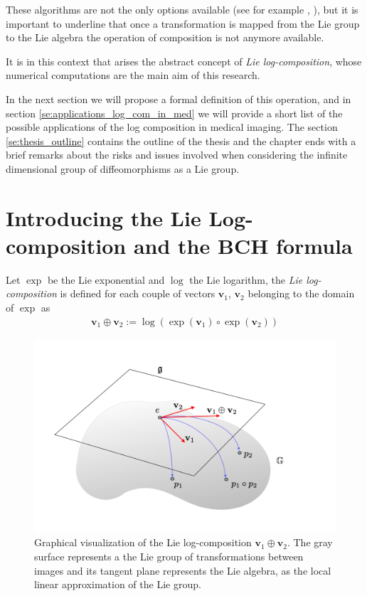 These algorithms are not the only options available (see for example \cite{bossa2008algorithms}, \cite{bossa2008new}), but it is important to underline that once a transformation is mapped from the Lie group to the Lie algebra the operation of composition is not anymore available. 

It is in this context that arises the abstract concept of \emph{Lie log-composition}, whose numerical computations are the main aim of this research.

In the next section we will propose a formal definition of this operation, and in section \ref{se:applications_log_com_in_med} we will provide a short list of the possible applications of the log composition in medical imaging. 
The section \ref{se:thesis_outline} contains the outline of the thesis and the chapter ends with 
a brief remarks about the risks and issues involved when considering the infinite dimensional group of diffeomorphisms as a Lie group. 

\section{Introducing the Lie Log-composition and the BCH formula}\label{se:introducing_log_composition}

% 
Let $\exp$ be the Lie exponential  and $\log$ the Lie logarithm, the \emph{Lie log-composition} is defined for each couple of vectors $\mathbf{v}_1$, $\mathbf{v}_2$ belonging to the domain of $\exp$ as
\begin{align}\label{eq:bch_problem}
\mathbf{v}_1 \oplus \mathbf{v}_2 := \log(\exp(\mathbf{v}_1)\circ\exp(\mathbf{v}_2))
\end{align}

\begin{figure}[!ht]
	\centering
	\includegraphics[scale=0.35]{figures/log_composition.pdf}
	\caption{Graphical visualization of the Lie log-composition $\mathbf{v}_{1}\oplus \mathbf{v}_{2}$. The gray surface represents a the Lie group of transformations between images and its tangent plane represents the Lie algebra, as the local linear approximation of the Lie group. }
	\label{fig:composition}
\end{figure}

